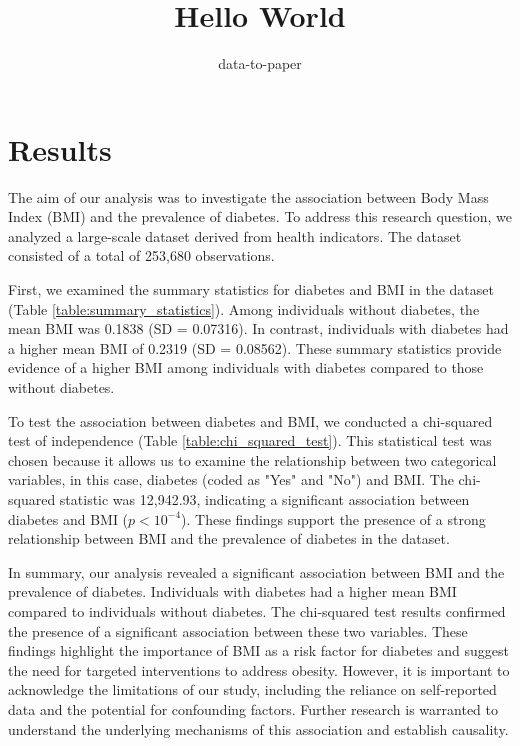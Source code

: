 \documentclass[12pt]{article}
\title{Hello World}
\author{data-to-paper}
\begin{document}
\maketitle

\section{Results}
The aim of our analysis was to investigate the association between Body Mass Index (BMI) and the prevalence of diabetes. To address this research question, we analyzed a large-scale dataset derived from health indicators. The dataset consisted of a total of 253,680 observations.

First, we examined the summary statistics for diabetes and BMI in the dataset (Table \ref{table:summary_statistics}). Among individuals without diabetes, the mean BMI was 0.1838 (SD = 0.07316). In contrast, individuals with diabetes had a higher mean BMI of 0.2319 (SD = 0.08562). These summary statistics provide evidence of a higher BMI among individuals with diabetes compared to those without diabetes.

To test the association between diabetes and BMI, we conducted a chi-squared test of independence (Table \ref{table:chi_squared_test}). This statistical test was chosen because it allows us to examine the relationship between two categorical variables, in this case, diabetes (coded as "Yes" and "No") and BMI. The chi-squared statistic was 12,942.93, indicating a significant association between diabetes and BMI ($p < 10^{-4}$). These findings support the presence of a strong relationship between BMI and the prevalence of diabetes in the dataset.

In summary, our analysis revealed a significant association between BMI and the prevalence of diabetes. Individuals with diabetes had a higher mean BMI compared to individuals without diabetes. The chi-squared test results confirmed the presence of a significant association between these two variables. These findings highlight the importance of BMI as a risk factor for diabetes and suggest the need for targeted interventions to address obesity. However, it is important to acknowledge the limitations of our study, including the reliance on self-reported data and the potential for confounding factors. Further research is warranted to understand the underlying mechanisms of this association and establish causality.
\end{document}
